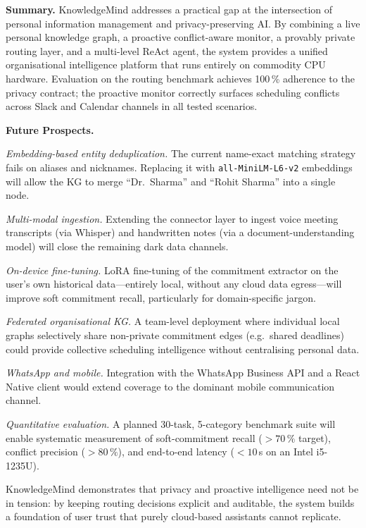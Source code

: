 \documentclass[10pt,twocolumn]{article}
\begin{document}
\noindent\textbf{Summary.}
KnowledgeMind addresses a practical gap at the intersection of personal
information management and privacy-preserving AI.
By combining a live personal knowledge graph, a proactive conflict-aware
monitor, a provably private routing layer, and a multi-level ReAct agent, the
system provides a unified organisational intelligence platform that runs
entirely on commodity CPU hardware.
Evaluation on the routing benchmark achieves 100\,\% adherence to the
privacy contract; the proactive monitor correctly surfaces scheduling conflicts
across Slack and Calendar channels in all tested scenarios.

\medskip\noindent\textbf{Future Prospects.}

\noindent\emph{Embedding-based entity deduplication.}
The current name-exact matching strategy fails on aliases and nicknames.
Replacing it with \texttt{all-MiniLM-L6-v2} embeddings will allow the KG to
merge ``Dr.\ Sharma'' and ``Rohit Sharma'' into a single node.

\noindent\emph{Multi-modal ingestion.}
Extending the connector layer to ingest voice meeting transcripts (via
Whisper) and handwritten notes (via a document-understanding model) will
close the remaining dark data channels.

\noindent\emph{On-device fine-tuning.}
LoRA fine-tuning of the commitment extractor on the user's own historical
data—entirely local, without any cloud data egress—will improve soft
commitment recall, particularly for domain-specific jargon.

\noindent\emph{Federated organisational KG.}
A team-level deployment where individual local graphs selectively share
non-private commitment edges (e.g.\ shared deadlines) could provide
collective scheduling intelligence without centralising personal data.

\noindent\emph{WhatsApp and mobile.}
Integration with the WhatsApp Business API and a React Native client would
extend coverage to the dominant mobile communication channel.

\noindent\emph{Quantitative evaluation.}
A planned 30-task, 5-category benchmark suite will enable systematic
measurement of soft-commitment recall ($>70\,\%$ target), conflict precision
($>80\,\%$), and end-to-end latency ($<10$\,s on an Intel i5-1235U).

\vspace{4pt}
KnowledgeMind demonstrates that privacy and proactive intelligence need not be
in tension: by keeping routing decisions explicit and auditable, the system
builds a foundation of user trust that purely cloud-based assistants cannot
replicate.
\end{document}
